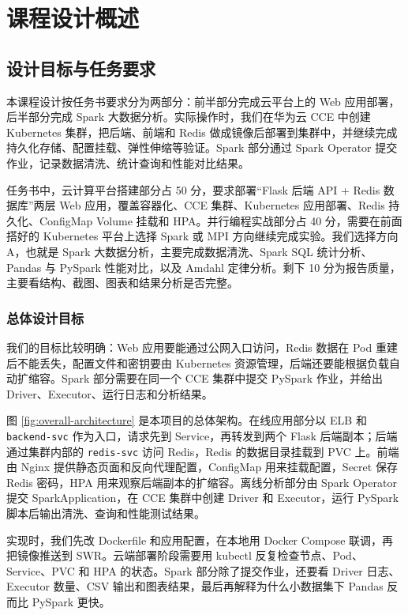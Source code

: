 \section{课程设计概述}
\subsection{设计目标与任务要求}

本课程设计按任务书要求分为两部分：前半部分完成云平台上的 Web 应用部署，后半部分完成 Spark 大数据分析。实际操作时，我们在华为云 CCE 中创建 Kubernetes 集群，把后端、前端和 Redis 做成镜像后部署到集群中，并继续完成持久化存储、配置挂载、弹性伸缩等验证。Spark 部分通过 Spark Operator 提交作业，记录数据清洗、统计查询和性能对比结果。

任务书中，云计算平台搭建部分占 50 分，要求部署“Flask 后端 API + Redis 数据库”两层 Web 应用，覆盖容器化、CCE 集群、Kubernetes 应用部署、Redis 持久化、ConfigMap Volume 挂载和 HPA。并行编程实战部分占 40 分，需要在前面搭好的 Kubernetes 平台上选择 Spark 或 MPI 方向继续完成实验。我们选择方向 A，也就是 Spark 大数据分析，主要完成数据清洗、Spark SQL 统计分析、Pandas 与 PySpark 性能对比，以及 Amdahl 定律分析。剩下 10 分为报告质量，主要看结构、截图、图表和结果分析是否完整。

\subsubsection{总体设计目标}

我们的目标比较明确：Web 应用要能通过公网入口访问，Redis 数据在 Pod 重建后不能丢失，配置文件和密钥要由 Kubernetes 资源管理，后端还要能根据负载自动扩缩容。Spark 部分需要在同一个 CCE 集群中提交 PySpark 作业，并给出 Driver、Executor、运行日志和分析结果。

图 \ref{fig:overall-architecture} 是本项目的总体架构。在线应用部分以 ELB 和 \verb|backend-svc| 作为入口，请求先到 Service，再转发到两个 Flask 后端副本；后端通过集群内部的 \verb|redis-svc| 访问 Redis，Redis 的数据目录挂载到 PVC 上。前端由 Nginx 提供静态页面和反向代理配置，ConfigMap 用来挂载配置，Secret 保存 Redis 密码，HPA 用来观察后端副本的扩缩容。离线分析部分由 Spark Operator 提交 SparkApplication，在 CCE 集群中创建 Driver 和 Executor，运行 PySpark 脚本后输出清洗、查询和性能测试结果。


实现时，我们先改 Dockerfile 和应用配置，在本地用 Docker Compose 联调，再把镜像推送到 SWR。云端部署阶段需要用 kubectl 反复检查节点、Pod、Service、PVC 和 HPA 的状态。Spark 部分除了提交作业，还要看 Driver 日志、Executor 数量、CSV 输出和图表结果，最后再解释为什么小数据集下 Pandas 反而比 PySpark 更快。

